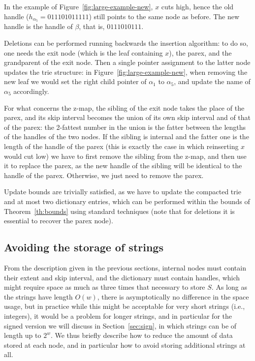 \documentclass[a4paper]{article}
\newcommand{\?}{\mskip1.5mu}
\begin{document}
In the example of Figure~\ref{fig:large-example-new}, $x$ cuts high, hence the old handle ($h_{\alpha_5}=011101011111$) still
points to the same node as before. The new handle is the handle of $\beta$, that is,
$0111010111$.

Deletions can be performed running backwards the insertion algorithm: to do so, one needs
the exit node (which is the leaf containing $x$), the parex, and the grandparent of the exit node. Then a single pointer
assignment to the latter node updates the trie structure: in Figure~\ref{fig:large-example-new},
when removing the new leaf we would set the right child pointer of $\alpha_1$ to $\alpha_5$,
and update the name of $\alpha_5$ accordingly. 

For what concerns the z-map, the sibling of the exit node takes the place of the parex, and its skip interval
becomes the union of its own skip interval and of that of the parex: the 2-fattest number in the union is the fatter
between the lengths of the handles of the two nodes. If the sibling is internal and the fatter one is the length of the handle of the parex (this
is exactly the case in which reinserting $x$ would cut low)
we have to first remove the sibling from the z-map, and then use it to replace the parex, as the new handle
of the sibling will be identical to the handle of the parex. Otherwise,
we just need to remove the parex.

Update bounds are trivially satisfied, as we have to update the compacted trie and at most two dictionary entries,
which can be performed within the bounds of Theorem~\ref{th:bounds} using standard techniques (note that for deletions
it is essential to recover the parex node).

\subsection{Avoiding the storage of strings}
\label{sec:space}

From the description given in the previous sections, 
internal nodes must contain their extent and skip interval, and the dictionary must contain
handles, which might require space as much as three times that
necessary to store $S$. As long as the strings have length $O(w)$, there is asymptotically
no difference in the space usage, but in practice
while this might be acceptable for very short strings (i.e., integers),
it would be a problem for longer strings, and in particular for the signed version we will discuss in Section~\ref{sec:sign}, 
in which strings can be of length up to $2^w$.
We thus briefly describe how to reduce the amount of data stored at each node, and in particular how to avoid storing additional
strings at all.
\end{document}
